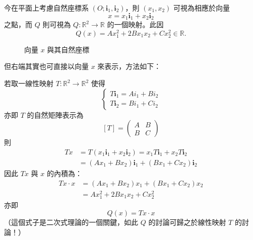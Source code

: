 今在平面上考慮自然座標系 $(O; \mathbf{i}_1, \mathbf{i}_2)$，則 $(x_1, x_2)$ 可視為相應於向量
\[
x = x_1 \mathbf{i}_1 + x_2 \mathbf{i}_2
\]
之點，而 $Q$ 則可視為 $Q: \mathbb{R}^2 \to \mathbb{R}$ 的一個映射。此因
\[
Q(x) = Ax_1^2 + 2Bx_1 x_2 + Cx_2^2 \in \mathbb{R}.
\]

\begin{figure}[htbp]
\centering
{}
\caption{向量 $x$ 與其自然座標}
\label{fig:b4-ch4-fig2-1}
\end{figure}

但右端其實也可直接以向量 $x$ 來表示，方法如下：

若取一線性映射 $T: \mathbb{R}^2 \to \mathbb{R}^2$ 使得
\[
\begin{cases}
T\mathbf{i}_1 = Ai_1 + Bi_2 \\
T\mathbf{i}_2 = Bi_1 + Ci_2
\end{cases}
\]
亦即 $T$ 的自然矩陣表示為
\[
[T] = \begin{pmatrix} A & B \\ B & C \end{pmatrix}
\]
則
\[
\begin{aligned}
Tx &= T(x_1 \mathbf{i}_1 + x_2 \mathbf{i}_2) = x_1 T\mathbf{i}_1 + x_2 T\mathbf{i}_2 \\
&= (Ax_1 + Bx_2)\mathbf{i}_1 + (Bx_1 + Cx_2)\mathbf{i}_2
\end{aligned}
\]
因此 $Tx$ 與 $x$ 的內積為\footnotemark：\label{note:b4-ch4-tx-image}
\[
\begin{aligned}
Tx \cdot x &= (Ax_1 + Bx_2)x_1 + (Bx_1 + Cx_2)x_2 \\
&= Ax_1^2 + 2Bx_1 x_2 + Cx_2^2
\end{aligned}
\]
亦即
\begin{equation}
Q(x) = Tx \cdot x
\label{eq:b4-ch4-quadratic-form-inner-prod}
\end{equation}
（這個式子是二次式理論的一個關鍵，如此 $Q$ 的討論可歸之於線性映射 $T$ 的討論！）

